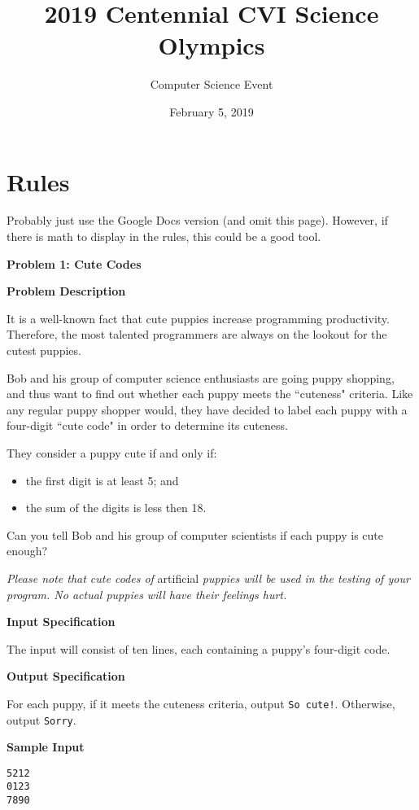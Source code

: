 \documentclass[11pt]{article}
\title{2019 Centennial CVI Science Olympics}
\author{Computer Science Event}
\date{February 5, 2019}
\newcommand{\problem}[2]{\textbf{\Large Problem #1: #2} \vspace{0.4em}}
\newcommand{\heading}[1]{\vspace{0.6em} \textbf{#1}}
\begin{document}
\maketitle

\section{Rules}

Probably just use the Google Docs version (and omit this page). However, if there is math to display in the rules, this could be a good tool.

\pagebreak



\problem{1}{Cute Codes}


\heading{Problem Description}

It is a well-known fact that cute puppies increase programming productivity. Therefore, the most talented programmers are always on the lookout for the cutest puppies.

Bob and his group of computer science enthusiasts are going puppy shopping, and thus want to find out whether each puppy meets the ``cuteness" criteria. Like any regular puppy shopper would, they have decided to label each puppy with a four-digit ``cute code" in order to determine its cuteness.

They consider a puppy cute if and only if:
\begin{itemize}
    \item the first digit is at least 5; and
    \item the sum of the digits is less then 18.
\end{itemize}

Can you tell Bob and his group of computer scientists if each puppy is cute enough?

\textit{Please note that cute codes of} artificial \textit{puppies will be used in the testing of your program. No actual puppies will have their feelings hurt.}


\heading{Input Specification}

The input will consist of ten lines, each containing a puppy's four-digit code.


\heading{Output Specification}

For each puppy, if it meets the cuteness criteria, output \verb|So cute!|. Otherwise, output \verb|Sorry|.


\heading{Sample Input}
\vspace{-\topsep}
\begin{verbatim}
5212
0123
7890
\end{verbatim}
\end{document}
